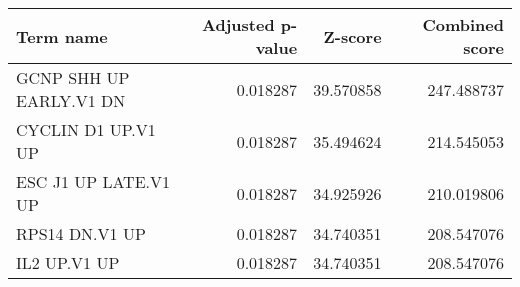 \begin{tabular}{lrrr}
\toprule
              Term name &  Adjusted p-value &   Z-score &  Combined score \\
\midrule
GCNP SHH UP EARLY.V1 DN &          0.018287 & 39.570858 &      247.488737 \\
     CYCLIN D1 UP.V1 UP &          0.018287 & 35.494624 &      214.545053 \\
   ESC J1 UP LATE.V1 UP &          0.018287 & 34.925926 &      210.019806 \\
         RPS14 DN.V1 UP &          0.018287 & 34.740351 &      208.547076 \\
           IL2 UP.V1 UP &          0.018287 & 34.740351 &      208.547076 \\
\bottomrule
\end{tabular}
